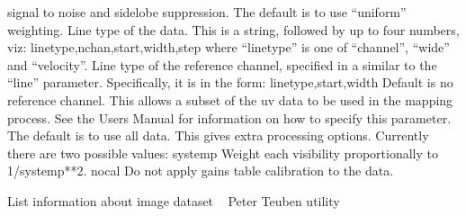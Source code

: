 {signal to noise and sidelobe suppression. The default is to use
``uniform'' weighting. 
Line type of the data. This is a string, followed by up to four
numbers, viz: 
{\eightpoint\begintt
  linetype,nchan,start,width,step
\endtt}
where ``linetype'' is one of ``channel'', ``wide'' and ``velocity''.
Line type of the reference channel, specified in a similar to the
``line'' parameter. Specifically, it is in the form:
{\eightpoint\begintt
  linetype,start,width
\endtt}
Default is no reference channel.
This allows a subset of the uv data to be used in the mapping
process. See the Users Manual for information on how to specify
this parameter. The default is to use all data.
This gives extra processing options. Currently there are two
possible values:
{\eightpoint\begintt
  systemp  Weight each visibility proportionally to 1/systemp**2.
  nocal    Do not apply gains table calibration to the data.
\endtt}
\par}
%
\noindent List information about image dataset
\newline \ 
\newline {} Peter Teuben
\newline {} utility
